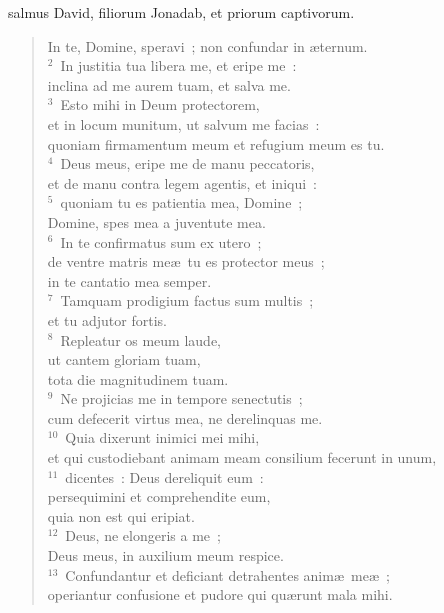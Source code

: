 \bchapter
{}salmus David, filiorum Jonadab, et priorum captivorum. \begin{flushleft}\begin{verse}\vspace{6pt}In te, Domine, speravi~; non confundar in \ae ternum.\\
${}^{2}$~In justitia tua libera me, et eripe me~:\\ inclina ad me aurem tuam, et salva me.\\
${}^{3}$~Esto mihi in Deum protectorem,\\ et in locum munitum, ut salvum me facias~:\\ quoniam firmamentum meum et refugium meum es tu.\\
${}^{4}$~Deus meus, eripe me de manu peccatoris,\\ et de manu contra legem agentis, et iniqui~:\\
${}^{5}$~quoniam tu es patientia mea, Domine~;\\ Domine, spes mea a juventute mea.\\
${}^{6}$~In te confirmatus sum ex utero~;\\ de ventre matris me\ae\ tu es protector meus~;\\ in te cantatio mea semper.\\
${}^{7}$~Tamquam prodigium factus sum multis~;\\ et tu adjutor fortis.\\
${}^{8}$~Repleatur os meum laude,\\ ut cantem gloriam tuam,\\ tota die magnitudinem tuam.\\
${}^{9}$~Ne projicias me in tempore senectutis~;\\ cum defecerit virtus mea, ne derelinquas me.\\
${}^{10}$~Quia dixerunt inimici mei mihi,\\ et qui custodiebant animam meam consilium fecerunt in unum,\\
${}^{11}$~dicentes~: Deus dereliquit eum~:\\ persequimini et comprehendite eum,\\ quia non est qui eripiat.\\
${}^{12}$~Deus, ne elongeris a me~;\\ Deus meus, in auxilium meum respice.\\
${}^{13}$~Confundantur et deficiant detrahentes anim\ae\ me\ae~;\\ operiantur confusione et pudore qui qu\ae runt mala mihi.\\

\end{verse}
\end{flushleft}
